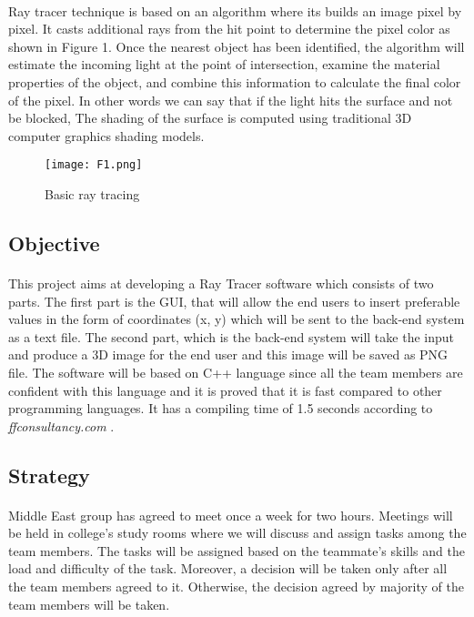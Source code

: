 \documentclass{article}
\begin{document}
\paragraph{}
Ray tracer technique is based on an algorithm where its builds an image pixel by pixel. It casts additional rays from the hit point to determine the pixel color as shown in Figure 1.
Once the nearest object has been identified, the algorithm will estimate the incoming light at the point of intersection, examine the material properties of the object, and combine this information to calculate the final color of the pixel. In other words we can say that if the light hits the surface and not be blocked,  The shading of the surface is computed using traditional 3D computer graphics shading models. 


\begin{figure}
    \centering
    \texttt{[image: F1.png]}
    \caption{Basic ray tracing}
    \label{figure1}
\end{figure}

\subsection{Objective}

\paragraph{}
This project aims at developing a Ray Tracer software which consists of two parts. The first part is the GUI, that will allow the end users to insert preferable values in the form of coordinates (x, y) which will be sent to the back-end system as a text file.
The second part, which is the back-end system will take the input and produce  a 3D image for the end user and this image will be saved as PNG file. 
The software will be based on C++ language since all the team members are confident with this language and it is proved that it is fast compared to other programming languages. It has a compiling time of 1.5 seconds according to \textit{ffconsultancy.com }.

\subsection{Strategy}
\paragraph{}
Middle East group has agreed to meet once a week for two hours. Meetings will be held in college's study rooms where we will discuss and assign tasks among the team members. The tasks will be assigned based on the teammate's skills and the load and difficulty of the task. Moreover,  a decision will be taken only after all the team members agreed to it. Otherwise, the decision agreed by majority of the team members will be taken.
\end{document}

